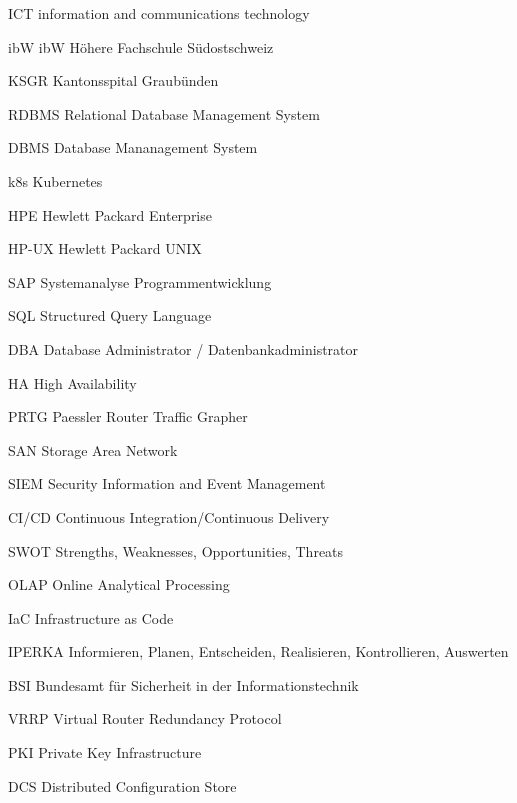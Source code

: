 
\begin{abkuerzungen}[MUSTER] %
    \item[ICT] information and communications technology
    \item[ibW] ibW Höhere Fachschule Südostschweiz
    \item[KSGR] Kantonsspital Graubünden
    \item[\Gls{RDBMS}] Relational Database Management System
    \item[\Gls{DBMS}] Database Mananagement System
    \item[k8s] \Gls{Kubernetes}
    \item[HPE] Hewlett Packard Enterprise
    \item[\Gls{HP-UX}] Hewlett Packard \Gls{UNIX}
    \item[SAP] Systemanalyse Programmentwicklung
    \item[SQL] Structured Query Language
    \item[DBA] Database Administrator / Datenbankadministrator
    \item[HA] High Availability
    \item[\Gls{PRTG}] Paessler Router Traffic Grapher
    \item[\Gls{SAN}] Storage Area Network
    \item[\Gls{SIEM}] Security Information and Event Management
    \item[\Gls{CI/CD}] Continuous Integration/Continuous Delivery
    \item[\Gls{SWOT}] Strengths, Weaknesses, Opportunities, Threats
    \item[\Gls{OLAP}] Online Analytical Processing
    \item[IaC] Infrastructure as Code
    \item[IPERKA] Informieren, Planen, Entscheiden, Realisieren, Kontrollieren, Auswerten
    \item[BSI] Bundesamt für Sicherheit in der Informationstechnik
    \item[\Gls{VRRP}] Virtual Router Redundancy Protocol
    \item[\Gls{PKI}] Private Key Infrastructure
    \item[DCS] Distributed Configuration Store
\end{abkuerzungen}